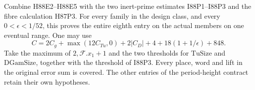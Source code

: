 Combine H88E2--H88E5 with the two inert-prime estimates I88P1--I88P3
and the fibre calculation H87P3. For every family in the design
class, and every $0<\epsilon<1/52$, this proves the entire eighth
entry on the actual members on one eventual range. One may use
\[
 C=2C_g+\max(12C_{Tu},0)+2|C_D|+4+
                         18(1+1/\epsilon)+848 .
\]
Take the maximum of $2,\mathcal F.x_1+1$ and the two thresholds
for $\mathrm{TuSize}$ and $\mathrm{DGamSize}$, together with the
threshold of I88P3. Every place, word and lift in the original
error sum is covered. The other entries of the period-height
contract retain their own hypotheses.
